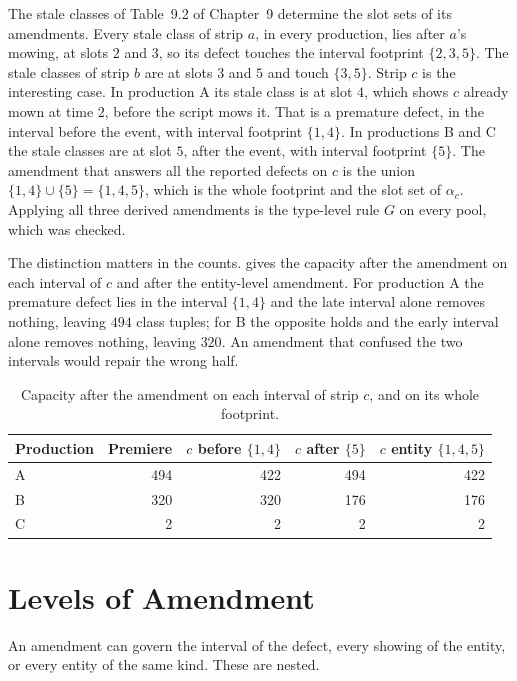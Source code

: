\documentclass[11pt,twoside,openright]{book}
\theoremstyle{plain}
\theoremstyle{definition}
\theoremstyle{remark}
\begin{document}
The stale classes of Table~9.2 of Chapter~9 determine the slot sets of its amendments. Every stale class of strip $a$, in every production, lies after $a$'s mowing, at slots $2$ and $3$, so its defect touches the interval footprint $\{2,3,5\}$. The stale classes of strip $b$ are at slots $3$ and $5$ and touch $\{3,5\}$. Strip $c$ is the interesting case. In production A its stale class is at slot $4$, which shows $c$ already mown at time $2$, before the script mows it. That is a premature defect, in the interval before the event, with interval footprint $\{1,4\}$. In productions B and C the stale classes are at slot $5$, after the event, with interval footprint $\{5\}$. The amendment that answers all the reported defects on $c$ is the union $\{1,4\}\cup\{5\}=\{1,4,5\}$, which is the whole footprint and the slot set of $\alpha_c$. Applying all three derived amendments is the type-level rule $G$ on every pool, which was checked.

The distinction matters in the counts.  gives the capacity after the amendment on each interval of $c$ and after the entity-level amendment. For production A the premature defect lies in the interval $\{1,4\}$ and the late interval alone removes nothing, leaving $494$ class tuples; for B the opposite holds and the early interval alone removes nothing, leaving $320$. An amendment that confused the two intervals would repair the wrong half.

\begin{table}[ht]
\centering
\begin{tabular}{@{}lrrrr@{}}
\toprule
Production & Premiere & $c$ before $\{1,4\}$ & $c$ after $\{5\}$ & $c$ entity $\{1,4,5\}$\\
\midrule
A & 494 & 422 & 494 & 422\\
B & 320 & 320 & 176 & 176\\
C & 2 & 2 & 2 & 2\\
\bottomrule
\end{tabular}
\caption{Capacity after the amendment on each interval of strip $c$, and on its whole footprint.}\label{tab:levels}
\end{table}

\section{Levels of Amendment}\label{sec:levels}

An amendment can govern the interval of the defect, every showing of the entity, or every entity of the same kind. These are nested.
\end{document}
